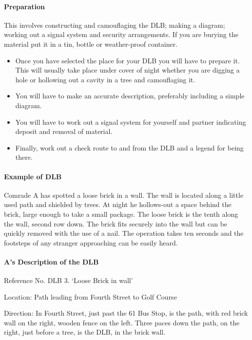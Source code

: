 \paragraph{Preparation}

This involves constructing and camouflaging the DLB; making a diagram;
working out a signal system and security arrangements. If you are
burying the material put it in a tin, bottle or weather-proof container.

\begin{itemize}
\tightlist
\item
  Once you have selected the place for your DLB you will have to prepare
  it. This will usually take place under cover of night whether you are
  digging a hole or hollowing out a cavity in a tree and camouflaging
  it.
\item
  You will have to make an accurate description, preferably including a
  simple diagram.
\item
  You will have to work out a signal system for yourself and partner
  indicating deposit and removal of material.
\item
  Finally, work out a check route to and from the DLB and a legend for
  being there.
\end{itemize}

\paragraph{Example of DLB}

Comrade A has spotted a loose brick in a wall. The wall is located along
a little used path and shielded by trees. At night he hollows-out a
space behind the brick, large enough to take a small package. The loose
brick is the tenth along the wall, second row down. The brick fits
securely into the wall but can be quickly removed with the use of a
nail. The operation takes ten seconds and the footsteps of any stranger
approaching can be easily heard.

\paragraph{A's Description of the DLB}

Reference No. DLB 3. `Loose Brick in wall'

{Location:} Path leading from Fourth Street to Golf Course

{Direction:} In Fourth Street, just past the 61 Bus Stop, is the path,
with red brick wall on the right, wooden fence on the left. Three paces
down the path, on the right, just before a tree, is the DLB, in the
brick wall.

